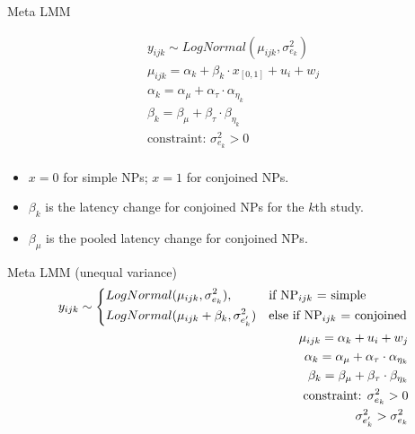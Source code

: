 \begin{frame}[fragile]{Meta LMM}
			
	\begin{equation*}
		\begin{aligned}	
			y_{ijk} \sim LogNormal(\mu_{ijk}, \sigma_{e_k}^2)\\
			\mu_{ijk} = \alpha_k + \beta_k \cdot x_{[0,1]} + u_i + w_j\\
			\alpha_k = \alpha_{\mu} + \alpha_{\tau} \cdot \alpha_{\eta_k}\\
			\beta_k = \beta_{\mu} + \beta_{\tau} \cdot \beta_{\eta_k}\\
			\text{constraint: }\sigma_{e_k}^2>0\\
		\end{aligned}	
	\end{equation*}		
	\begin{small}	
		\begin{itemize}
			\item $x=0$ for simple NPs; $x=1$ for conjoined NPs.
			\item $\beta_k$ is the latency change for conjoined NPs for the $k$th study.
			\item $\beta_{\mu}$ is the pooled latency change for conjoined NPs.
		\end{itemize}
	\end{small}
	
\end{frame}

\begin{frame}[fragile]{Meta LMM (unequal variance)}
	\begin{equation*}
		\begin{aligned}
			y_{ijk} \sim
			\begin{dcases*} 
				LogNormal(\mu_{ijk}, \sigma_{e_k}^2), &  if NP$_{ijk}$ = simple\\
				LogNormal(\mu_{ijk} + \beta_k, \sigma_{e'_k}^2) & else if NP$_{ijk}$ = conjoined\\
			\end{dcases*}\\
			\mu_{ijk} = \alpha_k + u_i + w_j\\
			\alpha_k = \alpha_{\mu} + \alpha_{\tau} \cdot \alpha_{\eta_k}\\
			\beta_k = \beta_{\mu} + \beta_{\tau} \cdot \beta_{\eta_k}\\
			\text{constraint: }\sigma_{e_k}^2>0\\
			\sigma_{e'_k}^2 > \sigma_{e_k}^2
		\end{aligned}
	\end{equation*}

\end{frame}


